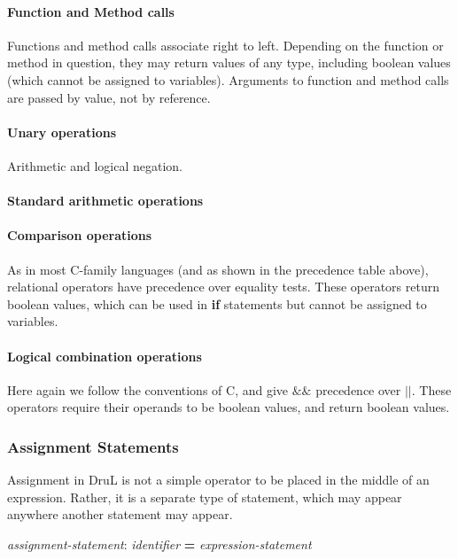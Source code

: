 \documentclass[11pt,twoside]{article}
\begin{document}
\paragraph{Function and Method calls}
Functions and method calls associate right to left.  Depending on the function or method in question, they may return values of any type, including boolean values (which cannot be assigned to variables). Arguments to function and method
calls are passed by value, not by reference.



\paragraph{Unary operations}
Arithmetic and logical negation.

\paragraph{Standard arithmetic operations}

\paragraph{Comparison operations}

As in most C-family languages (and as shown in the precedence table above), relational operators have precedence over equality tests.  These operators return boolean values, which can be used in \textbf{if} statements but cannot be assigned to variables.

\paragraph{Logical combination operations}

Here again we follow the conventions of C, and give $\&\&$ precedence over $||$.  These operators require their operands to be boolean values, and return boolean values.

\subsubsection{Assignment Statements}

Assignment in DruL is not a simple operator to be placed in the middle of an expression.  Rather, it is a separate type of statement, which may appear anywhere another statement may appear.  

\begin{center}
\emph{assignment-statement}: \emph{identifier} \textbf{=}  \emph{expression-statement}
\end{center}
\end{document}
